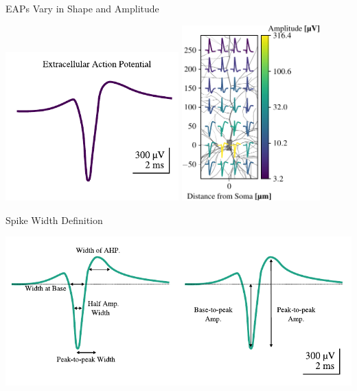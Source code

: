 \documentclass[aspectratio=169]{beamer}
\begin{document}
\begin{frame}{EAPs Vary in Shape and Amplitude}
    \begin{center}
        \includegraphics[width=0.5\textwidth]{images/eap.pdf}
        \includegraphics[width=0.4\textwidth]{images/grid_y_x_signals_2d_normalized.pdf}
    \end{center}
\end{frame}



\begin{frame}{Spike Width Definition}
    \begin{center}
        \includegraphics[width=\textwidth]{images/ap_eap.pdf}
    \end{center}
\end{frame}
\end{document}
